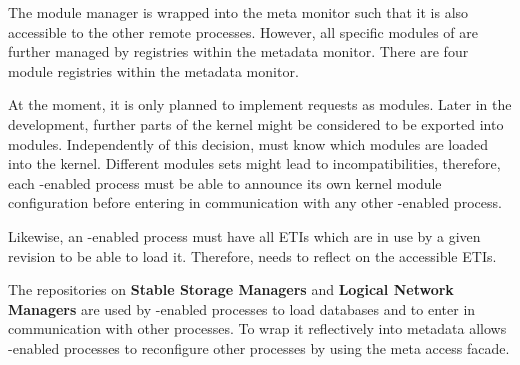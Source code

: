 \documentclass[a4paper, 10pt]{book}
\begin{document}
                                The module manager is wrapped into the meta monitor such that it is
                                also accessible to the other remote processes. However, all specific
                                modules of \SYNEIGHT are further managed by registries within the metadata
                                monitor. There are four module registries within the metadata monitor.
                                \begin{description}
                                    \item[Kernel Modules] At the moment, it is only planned to implement
                                        requests as modules. Later in the development, further parts of the
                                        kernel might be considered to be exported into modules.
                                        Independently of this decision, \SYNEIGHT must know which modules are
                                        loaded into the \SYNEIGHT kernel. Different modules sets might lead to
                                        incompatibilities, therefore, each \SYNEIGHT-enabled process must be
                                        able to announce its own kernel module configuration before entering
                                        in communication with any other \SYNEIGHT-enabled process.
                                    \item[ETIs] Likewise, an \SYNEIGHT-enabled process must have all ETIs
                                        which are in use by a given revision to be able to load
                                        it. Therefore, \SYNEIGHT needs to reflect on the accessible ETIs. 
                                    \item The repositories on \textbf{Stable Storage Managers} and
                                        \textbf{Logical Network Managers} are used by \SYNEIGHT-enabled
                                        processes to load databases and to enter in communication with other
                                        processes. To wrap it reflectively into metadata allows 
                                        \SYNEIGHT-enabled processes to reconfigure other processes by using the
                                        meta access facade. 
                                \end{description}
\end{document}
